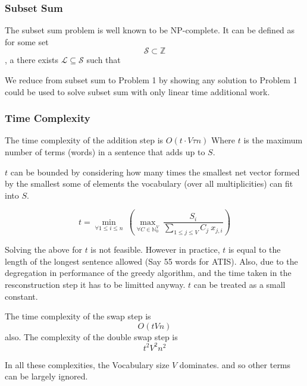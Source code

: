 \documentclass[]{scrartcl}
\numberwithin{equation}{section}
\numberwithin{figure}{section}
\theoremstyle{plain}
\theoremstyle{definition}
\begin{document}
\subsubsection{Subset Sum}
The subset sum problem is well known to be NP-complete.
It can be defined as for some set $$\mathcal{S}\subset\mathbb{Z}$$, a there exists  $\mathcal{L}\subseteq\mathcal{S}$ such that 


We reduce from subset sum to Problem 1 by showing any solution to Problem 1 could be used to solve subset sum with only linear time additional work.





\subsubsection{Time Complexity}
The time complexity of the addition step is $O(t \cdot V\tau n)$
Where $t$ is the maximum number of terms (words) in a sentence that adds up to $S$.

$t$ can be bounded by considering how many times the smallest net vector formed by the smallest some of elements the vocabulary (over all multiplicities) can fit into $S$.

$$t = \min_{\forall 1 \le i \le n}\: \left(\max_{\forall C \in \mathbb{N}_0^V}\: \frac{S_i}{\sum_{1\le j \le V} C_j\: x_{j,i}} \right)$$

Solving the above for $t$ is not feasible. However in practice, $t$ is equal to the length of the longest sentence allowed (Say 55 words for ATIS). Also, due to the degregation in performance of the greedy algorithm, and the time taken in the resconstruction step it has to be limitted anyway. $t$ can be treated as a small constant.

The time complexity of the swap step is $$O(tVn)$$ also.
The complexity of the double swap step is $$t^2 V^2 n^2$$

In all these complexities, the Vocabulary size $V$ dominates. and so other terms can be largely ignored.
\end{document}
